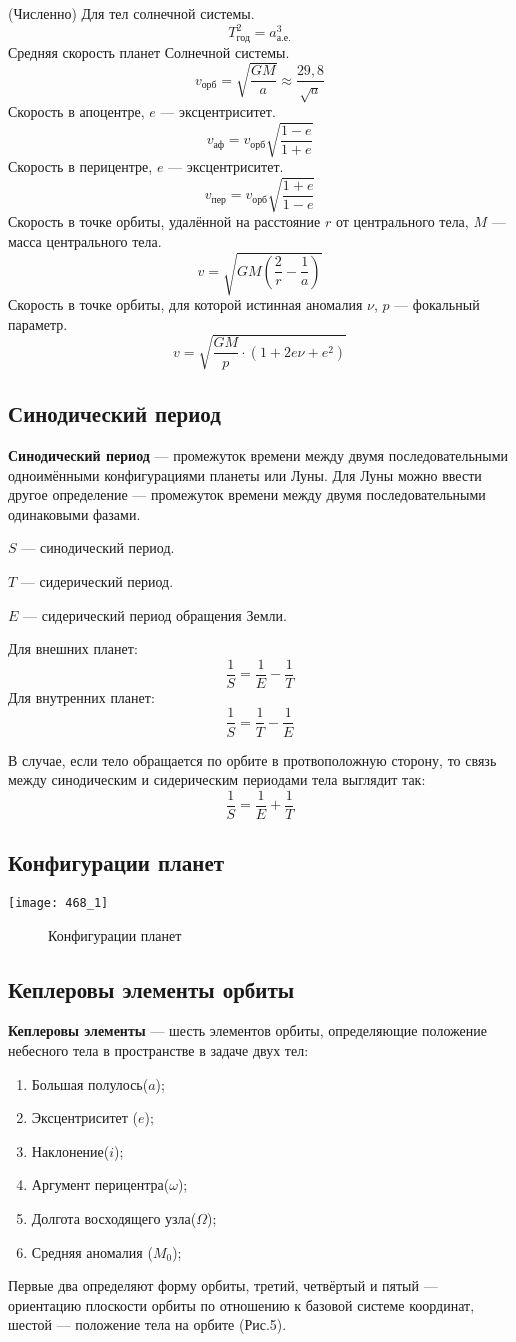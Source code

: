 \documentclass[10pt,a5paper]{article}
\begin{document}
(Численно) Для тел солнечной системы.$$T^2_{\text{год}}=a^3_{\text{а.е.}}$$
Средняя скорость планет Солнечной системы.$$v_{\text{орб}}=\sqrt{\frac{GM}{a}}\approx \frac{29,8}{\sqrt{a}}$$
Скорость в апоцентре, $e$ --- эксцентриситет.$$v_{\text{аф}}=v_{\text{орб}}\sqrt{\frac{1-e}{1+e}}$$
Скорость в перицентре, $e$ --- эксцентриситет.$$v_{\text{пер}}=v_{\text{орб}}\sqrt{\frac{1+e}{1-e}}$$
Скорость в точке орбиты, удалённой на расстояние $r$ от центрального тела, $M$ --- масса центрального тела.$$v=\sqrt{GM\left(\frac2r - \frac1a\right)}$$
Скорость в точке орбиты, для которой истинная аномалия $\nu$, $p$ --- фокальный параметр.$$v=\sqrt{\frac{GM}{p}\cdot(1+2e\nu+e^2)}$$
\subsection{Синодический период}

\textbf{Синодический период} --- промежуток времени между двумя последовательными одноимёнными конфигурациями планеты или Луны. Для Луны можно ввести другое определение --- промежуток времени между двумя последовательными одинаковыми фазами.

$S$ --- синодический период.

$T$ --- сидерический период.

$E$ --- сидерический период обращения Земли.

Для внешних планет:
$$\frac1S=\frac1E-\frac1T$$
Для внутренних планет:
$$\frac1S=\frac1T-\frac1E$$

В случае, если тело обращается по орбите в протвоположную сторону, то связь между синодическим и сидерическим периодами тела выглядит так:
$$\frac1S=\frac1E+\frac1T$$
\subsection{Конфигурации планет}
\begin{center}
\texttt{[image: 468\_1]}
\begin{figure}[h!]
\caption{Конфигурации планет}
\end{figure}
\end{center}
\subsection{Кеплеровы элементы орбиты}

\textbf{Кеплеровы элементы} --- шесть элементов орбиты, определяющие положение небесного тела в пространстве в задаче двух тел:
\begin{enumerate}
\item Большая полулось($a$);
\item Эксцентриситет ($e$);
\item Наклонение($i$);
\item Аргумент перицентра($\omega$);
\item Долгота восходящего узла($\Omega$);
\item Средняя аномалия ($M_0$);
\end{enumerate}
Первые два определяют форму орбиты, третий, четвёртый и пятый — ориентацию плоскости орбиты по отношению к базовой системе координат, шестой — положение тела на орбите (Рис.5).
\end{document}
